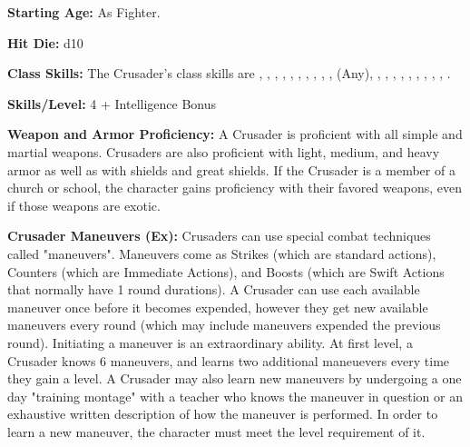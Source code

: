 \textbf{Starting Age:} As Fighter.

\textbf{Hit Die:} d10

\textbf{Class Skills:} The Crusader's class skills are , , , , , , , , , ,  (Any), , , , , , , , , , .

\textbf{Skills/Level:} 4 + Intelligence Bonus

\goodbab{}
\goodfor{}
\goodref{}
\goodwil{}

\begin{extraclasstable}{}
\end{extraclasstable}

\classfeatures

\textbf{Weapon and Armor Proficiency:} A Crusader is proficient with all simple and martial weapons. Crusaders are also proficient with light, medium, and heavy armor as well as with shields and great shields. If the Crusader is a member of a church or school, the character gains proficiency with their favored weapons, even if those weapons are exotic.

\textbf{Crusader Maneuvers (Ex):} Crusaders can use special combat techniques called "maneuvers". Maneuvers come as Strikes (which are standard actions), Counters (which are Immediate Actions), and Boosts (which are Swift Actions that normally have 1 round durations). A Crusader can use each available maneuver once before it becomes expended, however they get new available maneuvers every round (which may include maneuvers expended the previous round). Initiating a maneuver is an extraordinary ability. At first level, a Crusader knows 6 maneuvers, and learns two additional maneuevers every time they gain a level. A Crusader may also learn new maneuvers by undergoing a one day "training montage" with a teacher who knows the maneuver in question or an exhaustive written description of how the maneuver is performed. In order to learn a new maneuver, the character must meet the level requirement of it.

